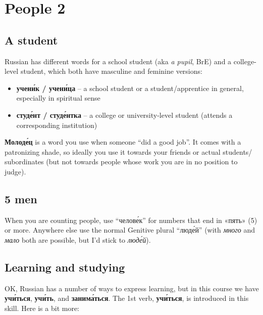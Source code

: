 \chapter{People 2}\label{people-2}

\section{A student}\label{a-student}

Russian has different words for a school student (aka \emph{a pupil},
BrE) and a college-level student, which both have masculine and feminine
versions:

\begin{itemize}
\tightlist
\item
  \textbf{учен\'{и}к / учен\'{и}ца} -- a school student or a student/apprentice
  in general, especially in spiritual sense
\item
  \textbf{студ\'{е}нт / студ\'{е}нтка} -- a college or university-level student
  (attends a corresponding institution)
\end{itemize}

\textbf{Молод\'{е}ц} is a word you use when someone ``did a good job''. It
comes with a patronizing shade, so ideally you use it towards your
friends or actual students/ subordinates (but not towards people whose
work you are in no position to judge).

\section{5 men}\label{men}

When you are counting people, use ``челов\'{е}к'' for numbers that end in
«пять» (5) or more. Anywhere else use the normal Genitive plural
``люд\'{е}й'' (with \emph{много} and \emph{мало} both are possible, but I'd
stick to \emph{люд\'{е}й}).

\section{Learning and studying}\label{learning-and-studying}

OK, Russian has a number of ways to express learning, but in this course
we have \textbf{уч\'{и}ться}, \textbf{уч\'{и}ть}, and \textbf{заним\'{а}ться}. The
1st verb, \textbf{уч\'{и}ться}, is introduced in this skill. Here is a bit
more:

